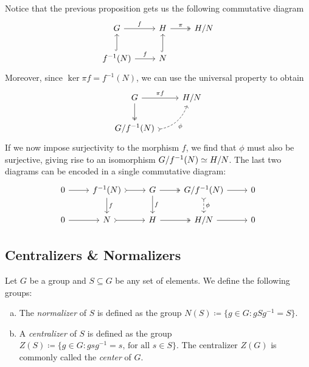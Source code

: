 Notice that the previous proposition gets us the following commutative diagram
\[
    \begin{tikzcd}
        G \ar[r, "f"] &H \ar[r, two heads, "\pi"] &H/N \\
        f^{-1}(N) \ar[u, hook] \ar[r, "f"] &N \ar[u, hook]
    \end{tikzcd}
\]
Moreover, since \(\ker \pi f = f^{-1}(N)\), we can use the universal property to
obtain
\[
    \begin{tikzcd}
        G \ar[d, two heads] \ar[r, "\pi f"] &H/N \\
        G/f^{-1}(N) \ar[ru, swap, tail, bend right, dashed, "\phi"] &
    \end{tikzcd}
\]
If we now impose surjectivity to the morphism \(f\), we find that \(\phi\) must
also be surjective, giving rise to an isomorphism \(G/f^{-1}(N) \simeq H/N\). The
last two diagrams can be encoded in a single commutative diagram:
\[
    \begin{tikzcd}
        0 \ar[r]
        &f^{-1}(N) \ar[d, "f"] \ar[r, tail]
        &G \ar[d, "f"] \ar[r, two heads]
        &G/f^{-1}(N) \ar[r] \ar[d, dashed, tail, "\phi"]
        &0 \\
        0 \ar[r]
        &N \ar[r, tail]
        &H \ar[r, two heads]
        &H/N \ar[r]
        &0
    \end{tikzcd}
\]

\subsection{Centralizers \& Normalizers}

\begin{definition}
    \label{def:normalizer-centralizer}
    Let \(G\) be a group and \(S \subseteq G\) be any set of elements. We define the
    following groups:
    \begin{enumerate}[(a)]\setlength\itemsep{0em}
        \item The \emph{normalizer} of \(S\) is defined as the group
              \(N(S) \coloneq \{g \in G \colon g S g^{-1} = S\}\).
        \item A \emph{centralizer} of \(S\) is defined as the group
              \(Z(S) \coloneq \{g \in G \colon g s g^{-1} = s \text{, for all } s \in
              S\}\). The centralizer \(Z(G)\) is commonly called the \emph{center} of \(G\).
    \end{enumerate}
\end{definition}

